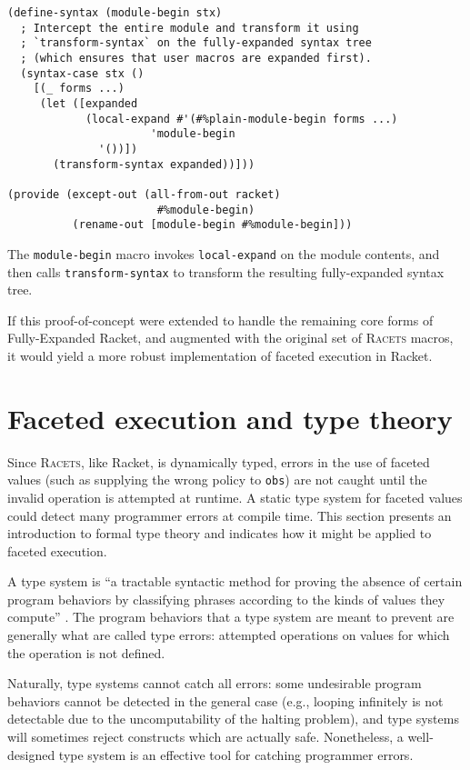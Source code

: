 \documentclass{article}
\begin{document}
\begin{lstlisting}
(define-syntax (module-begin stx)
  ; Intercept the entire module and transform it using
  ; `transform-syntax` on the fully-expanded syntax tree
  ; (which ensures that user macros are expanded first).
  (syntax-case stx ()
    [(_ forms ...)
     (let ([expanded
            (local-expand #'(#%plain-module-begin forms ...)
	                  'module-begin
			  '())])
       (transform-syntax expanded))]))

(provide (except-out (all-from-out racket)
                       #%module-begin)
          (rename-out [module-begin #%module-begin]))
\end{lstlisting}

The \texttt{module-begin} macro invokes \texttt{local-expand} on the module contents, and then calls \texttt{transform-syntax} to transform the resulting fully-expanded syntax tree.

If this proof-of-concept were extended to handle the remaining core forms of Fully-Expanded Racket, and augmented with the original set of \textsc{Racets} macros, it would yield a more robust implementation of faceted execution in Racket.



\section{Faceted execution and type theory\label{sec:types}}
Since \textsc{Racets}, like Racket, is dynamically typed, errors in the use of faceted values (such as supplying the wrong policy to \texttt{obs}) are not caught until the invalid operation is attempted at runtime. A static type system for faceted values could detect many programmer errors at compile time. This section presents an introduction to formal type theory and indicates how it might be applied to faceted execution.

A type system is ``a tractable syntactic method for proving the absence of certain program behaviors by classifying phrases according to the kinds of values they compute'' \cite{types}. The program behaviors that a type system are meant to prevent are generally what are called type errors: attempted operations on values for which the operation is not defined.

Naturally, type systems cannot catch all errors: some undesirable program behaviors cannot be detected in the general case (e.g., looping infinitely is not detectable due to the uncomputability of the halting problem), and type systems will sometimes reject constructs which are actually safe. Nonetheless, a well-designed type system is an effective tool for catching programmer errors.
\end{document}
